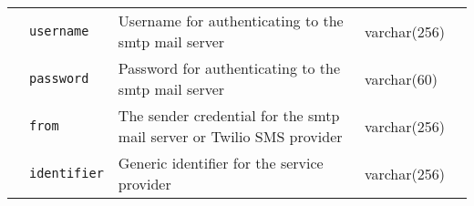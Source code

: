 \begin{landscape}
\begin{longtable}{ | m{} | m{} | m{} | m{} | m{} | }
        \cline{2-5}
                                                                         & \texttt{username}                         & Username for authenticating to the \acrshort{smtp} mail server                                                      & varchar(256)  &                               \\
        \cline{2-5}
                                                                         & \texttt{password}                         & Password for authenticating to the \acrshort{smtp} mail server                                                      & varchar(60)   &                               \\
        \cline{2-5}
                                                                         & \texttt{from}                             & The sender credential for the \acrshort{smtp} mail server or Twilio SMS provider                                    & varchar(256)  &                               \\
        \cline{2-5}
                                                                         & \texttt{identifier}                       & Generic identifier for the service provider                                                                         & varchar(256)  &                               \\


\end{longtable}
\end{landscape}
